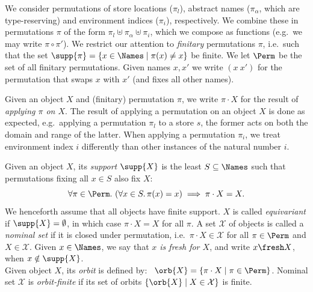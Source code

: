 \begin{definition}[Permutations]\label{def:perms}
  We consider permutations of store locations ($\pi_l$), abstract names ($\pi_\alpha$, which are type-reserving) and environment indices ($\pi_i$), respectively. 
  We combine these in permutations $\pi$ of the form $\pi_l\uplus\pi_\alpha\uplus\pi_i$, which
  we compose as functions (e.g.\ we may write $\pi\circ\pi'$). 
  We restrict our attention to \emph{finitary} permutations $\pi$, i.e.\ such that the set $
      \supp{\pi}=\{x\in\Names\mid \pi(x)\not= x\}$ be finite. We let $\Perm$ be the set of all finitary permutations.
Given names $x,x'$ we write $(x\ x')$ for the permutation that swaps $x$ with $x'$ (and fixes all other names).
\end{definition}

%
Given an object $X$ and (finitary) permutation $\pi$, we write $\pi\cdot X$ for the result of \emph{applying $\pi$ on $X$}.
%
The result of applying a permutation on an object $X$ is done as expected, e.g.\ applying
a permutation $\pi_l$ to a store $s$, the former acts on both the domain and range of
the latter. When applying a permutation $\pi_i$, we treat environment index $i$ differently than other instances of the natural number $i$.


\begin{definition}
  Given an object $X$, its \emph{support} $\supp{X}$ is the least $S\subseteq\Names$ such that permutations fixing all $x\in S$ also fix $X$:
  \[
\forall\pi\in\Perm.\ (\forall x\in S.\,\pi(x)=x)\implies \pi\cdot X=X.
\]
We henceforth assume that all objects have finite support.
$X$ is called \emph{equivariant} if $\supp{X}=\emptyset$, in which case $\pi\cdot X=X$ for all $\pi$.
A set $\mathcal X$ of objects is called a \emph{nominal set} if it is closed under permutation, i.e.\ $\pi\cdot X \in\mathcal X$ for all $\pi\in\Perm$ and $X\in\mathcal X$.
Given $x\in\Names$, we say that \emph{$x$ is fresh for $X$}, and write
$x\fresh X$, when $x\notin\supp{X}$.
\\
Given object $X$, its \emph{orbit} is defined by: \
$
\orb{X}= \{\pi\cdot X\mid \pi\in\Perm\}
$.
Nominal set $\mathcal X$ is \emph{orbit-finite} if its  set of orbits
$
\{\orb{X}\mid X\in\mathcal X\}
$
is finite.
\end{definition}


